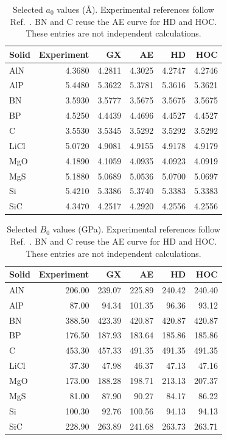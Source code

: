 \begin{table}[t]
\centering
\small
\caption{Selected $a_0$ values (\AA{}). Experimental references follow Ref.~. BN and C reuse the AE curve for HD and HOC. These entries are not independent calculations.}
\label{tab:selected-a0_A}
\begin{tabular}{lrrrrr}
\toprule
Solid & Experiment & GX & AE & HD & HOC \\
\midrule
AlN & 4.3680 & 4.2811 & 4.3025 & 4.2747 & 4.2746 \\
AlP & 5.4480 & 5.3622 & 5.3781 & 5.3616 & 5.3621 \\
BN & 3.5930 & 3.5777 & 3.5675 & 3.5675 & 3.5675 \\
BP & 4.5250 & 4.4439 & 4.4696 & 4.4527 & 4.4527 \\
C & 3.5530 & 3.5345 & 3.5292 & 3.5292 & 3.5292 \\
LiCl & 5.0720 & 4.9081 & 4.9155 & 4.9178 & 4.9179 \\
MgO & 4.1890 & 4.1059 & 4.0935 & 4.0923 & 4.0919 \\
MgS & 5.1880 & 5.0689 & 5.0536 & 5.0700 & 5.0697 \\
Si & 5.4210 & 5.3386 & 5.3740 & 5.3383 & 5.3383 \\
SiC & 4.3470 & 4.2517 & 4.2920 & 4.2556 & 4.2556 \\
\bottomrule
\end{tabular}
\end{table}

\begin{table}[t]
\centering
\small
\caption{Selected $B_0$ values (GPa). Experimental references follow Ref.~. BN and C reuse the AE curve for HD and HOC. These entries are not independent calculations.}
\label{tab:selected-B0_GPa}
\begin{tabular}{lrrrrr}
\toprule
Solid & Experiment & GX & AE & HD & HOC \\
\midrule
AlN & 206.00 & 239.07 & 225.89 & 240.42 & 240.40 \\
AlP & 87.00 & 94.34 & 101.35 & 96.36 & 93.12 \\
BN & 388.50 & 423.39 & 420.87 & 420.87 & 420.87 \\
BP & 176.50 & 187.93 & 183.64 & 185.86 & 185.86 \\
C & 453.30 & 457.33 & 491.35 & 491.35 & 491.35 \\
LiCl & 37.30 & 47.98 & 46.37 & 47.13 & 47.16 \\
MgO & 173.00 & 188.28 & 198.71 & 213.13 & 207.37 \\
MgS & 81.00 & 87.90 & 90.27 & 84.17 & 86.22 \\
Si & 100.30 & 92.76 & 100.56 & 94.13 & 94.13 \\
SiC & 228.90 & 263.89 & 241.68 & 263.73 & 263.71 \\
\bottomrule
\end{tabular}
\end{table}


